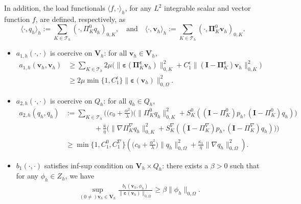 \documentclass[smallextended]{svjour3}
\numberwithin{equation}{section}
\numberwithin{figure}{section}
\numberwithin{table}{section}
\newcommand\bI{\mathbf{I}}
\newcommand\bV{\mathbf{V}}
\newcommand\bPi{\boldsymbol{\Pi}}
\newcommand\beps{\boldsymbol{\varepsilon}}
\newcommand\bv{\boldsymbol{v}}
\newcommand\cT{\mathcal{T}}
\begin{document}
    In addition, the load functionals $\langle f, \cdot \rangle_h$, for any $L^2$ integrable scalar and vector function $f$, are defined, respectively, as
    $$\langle \cdot, q_h \rangle_h:= \sum_{K \in \cT_h} (\cdot, \Pi^0_K q_h )_{0,K}, \quad \text{and} \quad \langle \cdot, \bv_h \rangle_h:= \sum_{K \in \cT_h} ( \cdot, \bPi^0_K \bv_h )_{0,K}.$$
	
	\begin{itemize}
		\item $a_{1,h}(\cdot, \cdot)$ is coercive on $\bV_h$: for all $\bv_h \in \bV_h$,
		\begin{align*}
			a_{1,h}(\bv_h, \bv_h) & \ge \sum_{K \in \cT_h} 2 \mu \Big( \| \beps( \bPi^{\beps}_K \bv_h)\|^2_{0,K} + C^{\epsilon}_1\|(\bI - \bPi^{\beps}_K) \bv_h\|_{0,K}^2 \Big) \\
			& \ge 2 \mu \min \{ 1, C^{\epsilon}_1\} \| \beps(\bv_h) \|_{0, \Omega}^2.
		\end{align*}
		
		\item $a_{2,h}(\cdot, \cdot)$ is coercive on $Q_h$: for all $q_h \in Q_h$,
		\begin{align*}
			a_{2,h}(q_h,q_h) &:= \sum_{K \in \cT_h} \bigg( \biggl( c_0 +\frac{\alpha^2}{{\lambda}}\biggr) \Big(
			\|\Pi^{0}_K  q_h\|^2_{0, K} + S^{0}_K( (\boldsymbol{I} - \Pi^{0}_K) p_h, (\boldsymbol{I} - \Pi^{0}_K) q_h)  \Big) \\
			& \qquad \qquad +\frac{\bar{\kappa}}{\eta}  \Big(\| \nabla \Pi^{\nabla}_K q_h\|^2_{0, K} + S^{\nabla}_K( (\boldsymbol{I} - \Pi^{\nabla}_K) p_h, (\boldsymbol{I} - \Pi^{\nabla}_K) q_h)  \Big) \bigg) \\
			& \ge \min \{ 1, C^0_1, C^{\nabla}_1\} \left( \biggl( c_0 +\frac{\alpha^2}{{\lambda}}\biggr) \| q_h\|^2_{0, \Omega} +\frac{\kappa_1}{\eta} \| \nabla q_h\|^2_{0, \Omega} \right).
		\end{align*}
		\item $b_1(\cdot, \cdot)$ satisfies inf-sup condition on $\bV_h \times Q_h$: there exists a $\beta>0$ such that for any $\phi_h \in Z_h$, we have
		\begin{align*}
			\sup_{(0 \neq)\bv_h \in \bV_h} \frac{b_1(\bv_h, \phi_h)}{\| \beps(\bv_h)\|_{0, \Omega}} \ge \beta \| \phi_h \|_{0, \Omega}.
		\end{align*}
	\end{itemize}
	
\end{document}
